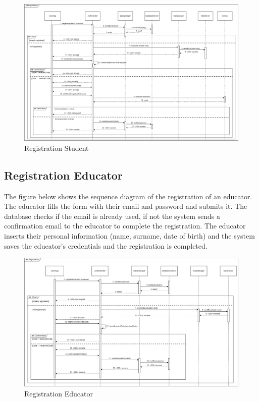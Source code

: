 \begin{figure}[H]
    \centering
    \includegraphics[width=1\textwidth]{images/seq_diagrams/RegistrationStd_DD.png}
    \caption{Registration Student}
\end{figure}
\clearpage

\subsection{Registration Educator}
The figure below shows the sequence diagram of the registration of an educator. The educator fills the form with their email and password and submits it. 
The database checks if the email is already used, if not the system sends a confirmation email to the educator to complete the registration. 
The educator inserts their personal information (name, surname, date of birth) and the system saves the educator's credentials and the registration is completed.\\
\begin{figure}[H]
    \centering
    \includegraphics[width=1\textwidth]{images/seq_diagrams/RegistrationEd_DD.png}
    \caption{Registration Educator}
\end{figure}
\clearpage

